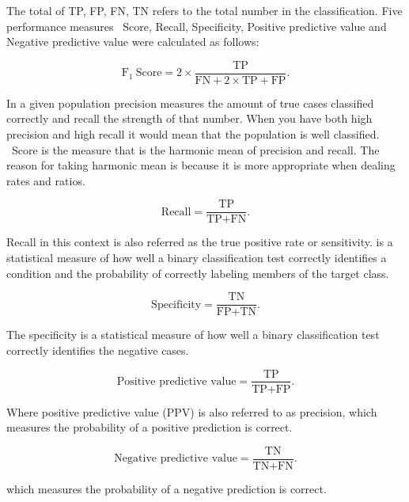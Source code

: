 The total of TP, FP, FN, TN refers to the total number in the classification. Five performance measures \F~Score, Recall, Specificity, Positive predictive value and Negative predictive value were calculated as follows:

\begin{equation*}
\textrm{F}_1~\textrm{Score} = 2 \times \frac{\textrm{TP}}{\textrm{FN} + 2\times \textrm{TP} + \textrm{FP}}.
\end{equation*}

In a given population precision measures the amount of true cases classified correctly and recall the strength of that number. When you have both high precision and high recall it would mean that the population is well classified. \F~Score is the measure that is the harmonic mean of precision and recall. The reason for taking harmonic mean is because it is more appropriate when dealing rates and ratios.  

\begin{equation*}
\textrm{Recall} = \frac{\textrm{TP}}{\textrm{TP} + \textrm{FN}}.
\end{equation*}

Recall in this context is also referred as the true positive rate or sensitivity.  is a statistical measure of how well a binary classification test correctly identifies a condition and the probability of correctly labeling members of the target class.

\begin{equation*}
\textrm{Specificity} = \frac{\textrm{TN}}{\textrm{FP} + \textrm{TN}}.
\end{equation*}

The specificity is a statistical measure of how well a binary classification test correctly identifies the negative cases.

\begin{equation*}
\textrm{Positive predictive value} = \frac{\textrm{TP}}{\textrm{TP} + \textrm{FP}}.
\end{equation*}

Where positive predictive value (PPV) is also referred to as precision, which measures the probability of a positive prediction is correct.

\begin{equation*}
\textrm{Negative predictive value} = \frac{\textrm{TN}}{\textrm{TN} + \textrm{FN}}.
\end{equation*}

which measures the probability of a negative prediction is correct.

